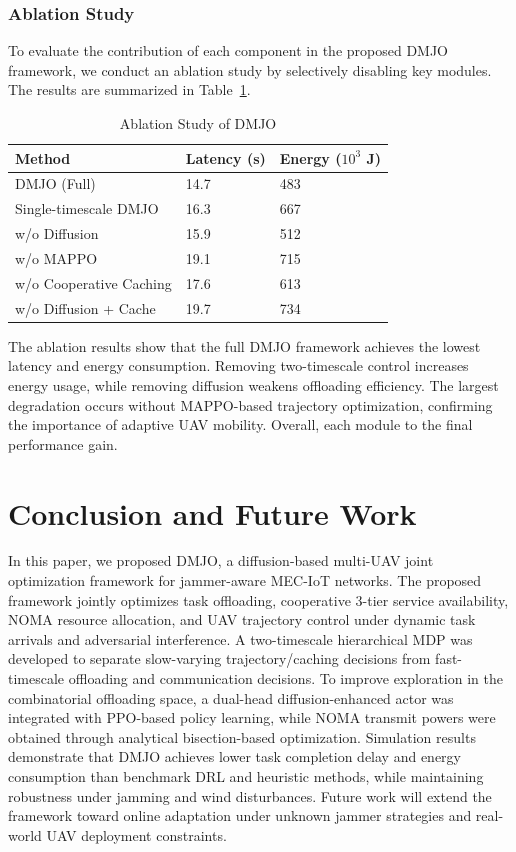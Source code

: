 \documentclass[journal]{IEEEtran}
\begin{document}
\subsubsection{Ablation Study}

To evaluate the contribution of each component in the proposed DMJO framework, we conduct an ablation study by selectively disabling key modules. The results are summarized in Table~\ref{tab:ablation}.

\begin{table}[!ht]
\centering
\caption{Ablation Study of DMJO}
\label{tab:ablation}
\scriptsize
\renewcommand{\arraystretch}{0.95}
\setlength{\tabcolsep}{2pt}
\begin{tabular}{|p{3.2cm}|p{2cm}|p{2cm}|}
\rowcolor{gray!20}
\hline
\textbf{Method} & \textbf{Latency (s)} & \textbf{Energy ($10^3$ J)} \\ \hline
DMJO (Full) & 14.7 & 483 \\ \hline
Single-timescale DMJO & 16.3 & 667 \\ \hline
w/o Diffusion & 15.9 & 512 \\ \hline
w/o MAPPO & 19.1 & 715 \\ \hline
w/o Cooperative Caching & 17.6 & 613 \\ \hline
w/o Diffusion + Cache & 19.7 & 734 \\ \hline
\end{tabular}
\end{table}

The ablation results show that the full DMJO framework achieves the lowest latency and energy consumption. Removing two-timescale control increases energy usage, while removing diffusion weakens offloading efficiency. The largest degradation occurs without MAPPO-based trajectory optimization, confirming the importance of adaptive UAV mobility. Overall, each module   to the final performance gain.


\section{Conclusion and Future Work}
\label{con}
In this paper, we proposed DMJO, a diffusion-based multi-UAV joint optimization framework for jammer-aware MEC-IoT networks. The proposed framework jointly optimizes task offloading, cooperative 3-tier service availability, NOMA resource allocation, and UAV trajectory control under dynamic task arrivals and adversarial interference. A two-timescale hierarchical MDP was developed to separate slow-varying trajectory/caching decisions from fast-timescale offloading and communication decisions. To improve exploration in the combinatorial offloading space, a dual-head diffusion-enhanced actor was integrated with PPO-based policy learning, while NOMA transmit powers were obtained through analytical bisection-based optimization. Simulation results demonstrate that DMJO achieves lower task completion delay and energy consumption than benchmark DRL and heuristic methods, while maintaining robustness under jamming and wind disturbances. Future work will extend the framework toward online adaptation under unknown jammer strategies and real-world UAV deployment constraints.
\end{document}
